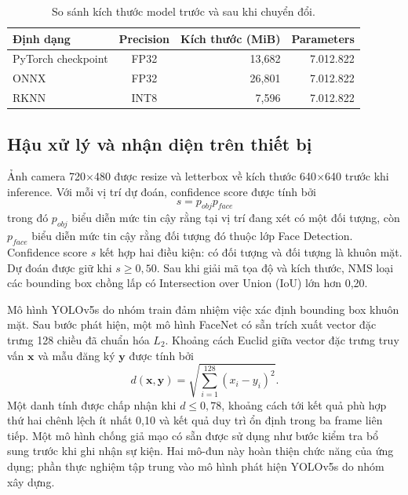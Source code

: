 \documentclass[11pt,a4paper]{article}
\begin{document}
\begin{table}[H]
\centering
\caption{So sánh kích thước model trước và sau khi chuyển đổi.}
\label{tab:model-size}
\small
\begin{tabular}{lcrr}
\toprule
Định dạng & Precision & Kích thước (MiB) & Parameters \\
\midrule
PyTorch checkpoint & FP32 & 13,682 & 7.012.822 \\
ONNX & FP32 & 26,801 & 7.012.822 \\
RKNN & INT8 & 7,596 & 7.012.822 \\
\bottomrule
\end{tabular}
\end{table}

\subsection{Hậu xử lý và nhận diện trên thiết bị}

Ảnh camera 720$\times$480 được resize và letterbox về kích thước 640$\times$640 trước khi inference. Với mỗi vị trí dự đoán, confidence score được tính bởi
\begin{equation}
s=p_{obj}p_{face}
\end{equation}
trong đó $p_{obj}$ biểu diễn mức tin cậy rằng tại vị trí đang xét có một đối tượng, còn $p_{face}$ biểu diễn mức tin cậy rằng đối tượng đó thuộc lớp Face Detection. Confidence score $s$ kết hợp hai điều kiện: có đối tượng và đối tượng là khuôn mặt. Dự đoán được giữ khi $s\geq0,50$. Sau khi giải mã tọa độ và kích thước, NMS loại các bounding box chồng lấp có Intersection over Union (IoU) lớn hơn 0,20.

Mô hình YOLOv5s do nhóm train đảm nhiệm việc xác định bounding box khuôn mặt. Sau bước phát hiện, một mô hình FaceNet có sẵn trích xuất vector đặc trưng 128 chiều đã chuẩn hóa $L_2$. Khoảng cách Euclid giữa vector đặc trưng truy vấn $\mathbf{x}$ và mẫu đăng ký $\mathbf{y}$ được tính bởi
\begin{equation}
d(\mathbf{x},\mathbf{y})=\sqrt{\sum_{i=1}^{128}(x_i-y_i)^2}.
\end{equation}
Một danh tính được chấp nhận khi $d\leq0,78$, khoảng cách tới kết quả phù hợp thứ hai chênh lệch ít nhất 0,10 và kết quả duy trì ổn định trong ba frame liên tiếp. Một mô hình chống giả mạo có sẵn được sử dụng như bước kiểm tra bổ sung trước khi ghi nhận sự kiện. Hai mô-đun này hoàn thiện chức năng của ứng dụng; phần thực nghiệm tập trung vào mô hình phát hiện YOLOv5s do nhóm xây dựng.
\end{document}

